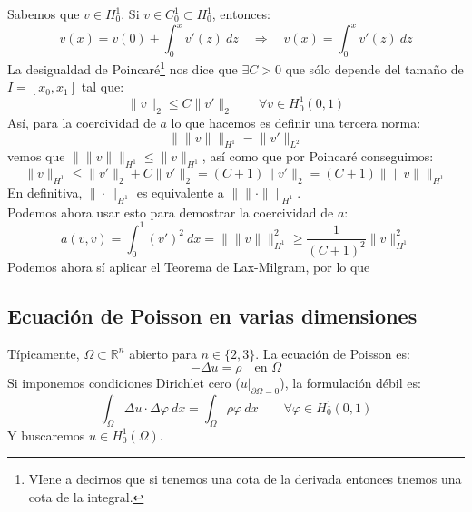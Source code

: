 \begin{ejemplo}
    \noindent
    Sabemos que $v\in H^1_0$. Si $v\in C_0^1\subset H^1_0$, entonces:
    \begin{equation*}
        v(x) = v(0) + \int_{0}^{x} v'(z)~dz  \quad\Longrightarrow\quad v(x) = \int_{0}^{x} v'(z)~dz 
    \end{equation*}
    La desigualdad de Poincaré\footnote{VIene a decirnos que si tenemos una cota de la derivada entonces tnemos una cota de la integral.} nos dice que $\exists C>0$ que sólo depende del tamaño de $I = [x_0,x_1]$ tal que: 
    \begin{equation*}
        \|v\|_2 \leq C\|v'\|_2 \qquad \forall v\in H_0^1(0,1)
    \end{equation*}
    Así, para la coercividad de $a$ lo que hacemos es definir una tercera norma:
    \begin{equation*}
        \|\!\|v\|\!\|_{H^1} = \|v'\|_{L^2}
    \end{equation*}
    vemos que $\|\!\|v\|\!\|_{H^1}\leq \|v\|_{H^1}$, así como que por Poincaré conseguimos:
    \begin{equation*}
        \|v\|_{H^1} \leq \|v'\|_2 + C\|v'\|_2 = (C+1)\|v'\|_2 = (C+1) \|\!\|v\|\!\|_{H^1}
    \end{equation*}
    En definitiva, $\|\cdot \|_{H^1}$ es equivalente a $\|\!\|\cdot \|\!\|_{H^1}$.\\

    \noindent
    Podemos ahora usar esto para demostrar la coercividad de $a$:
    \begin{equation*}
        a(v,v) = \int_{0}^{1} {(v')}^{2}~dx  = \|\!\|v\|\!\|^2_{H^1}\geq \frac{1}{{(C+1)}^{2}}\|v\|_{H^1}^2
    \end{equation*}
    Podemos ahora sí aplicar el Teorema de Lax-Milgram, por lo que 
\end{ejemplo}

\subsection{Ecuación de Poisson en varias dimensiones} %
\noindent
Típicamente, $\Omega\subset\mathbb{R}^n$ abierto para $n\in \{2,3\}$. La ecuación de Poisson es:
\begin{equation*}
    -\Delta u = \rho \quad \text{en\ } \Omega
\end{equation*}
Si imponemos condiciones Dirichlet cero ($u\big|_{\partial \Omega=0}$), la formulación débil es:
\begin{equation*}
    \int_\Omega \Delta u \cdot \Delta \varphi~dx = \int_{\Omega}\rho \varphi ~dx \qquad \forall \varphi \in H^1_0(0,1)
\end{equation*}
Y buscaremos $u\in H^1_0(\Omega)$.\\

